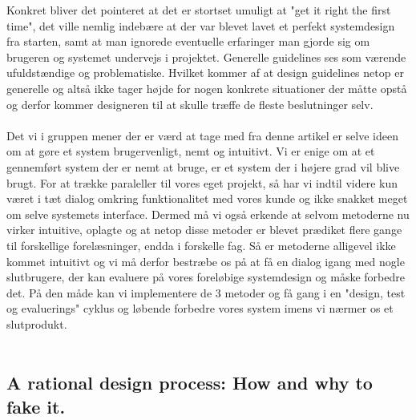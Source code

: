 \documentclass[12pt]{article}
\begin{document}
Konkret bliver det pointeret at det er stortset umuligt at "get it right the first time", det ville nemlig indebære at der var blevet lavet et perfekt systemdesign fra starten, samt at man ignorede eventuelle erfaringer man gjorde sig om brugeren og systemet undervejs i projektet. Generelle guidelines ses som værende ufuldstændige og problematiske. Hvilket kommer af at design guidelines netop er generelle og altså ikke tager højde for nogen konkrete situationer der måtte opstå og derfor kommer designeren til at skulle træffe de fleste beslutninger selv.\\\\
Det vi i gruppen mener der er værd at tage med fra denne artikel er selve ideen om at gøre et system brugervenligt, nemt og intuitivt. Vi er enige om at et gennemført system der er nemt at bruge, er et system der i højere grad vil blive brugt. For at trække paraleller til vores eget projekt, så har vi indtil videre kun været i tæt dialog omkring funktionalitet med vores kunde og ikke snakket meget om selve systemets interface. Dermed må vi også erkende at selvom metoderne nu virker intuitive, oplagte og at netop disse metoder er blevet prædiket flere gange til forskellige forelæsninger, endda i forskelle fag. Så er metoderne alligevel ikke kommet intuitivt og vi må derfor bestræbe os på at få en dialog igang med nogle slutbrugere, der kan evaluere på vores foreløbige systemdesign og måske forbedre det. På den måde kan vi implementere de 3 metoder og få gang i en "design, test og evaluerings" cyklus og løbende forbedre vores system imens vi nærmer os et slutprodukt.\\\\
\pagebreak

 \subsection{A rational design process: How and why to fake it.}
\end{document}
